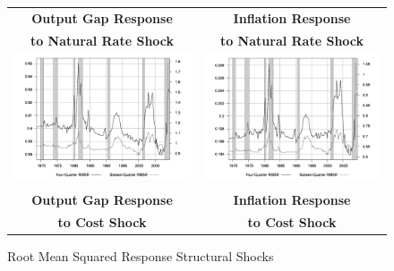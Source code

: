 \documentclass[12pt]{article}
\begin{document}
{\begin{figure}\caption{Root Mean Squared Response Structural Shocks}\label{fg:irf_structural_size}
\hspace*{-2pc}
\begin{tabular}{cc}\\
\textbf{Output Gap Response} & \textbf{Inflation Response} \\
\textbf{to Natural Rate Shock} & \textbf{to Natural Rate Shock}  \\
\includegraphics[scale=0.17]{images/RMS16_Output_Gap_Natural_Rate_Shock.png} & \includegraphics[scale=0.17]{images/RMS16_Inflation_Natural_Rate_Shock.png} \\\\
\textbf{Output Gap Response} & \textbf{Inflation Response} \\
\textbf{to Cost Shock} & \textbf{to Cost Shock}  \\

\end{tabular}
\end{figure}}
\end{document}
